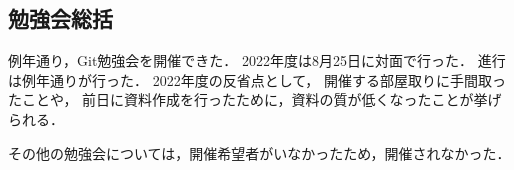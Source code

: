 \subsection*{勉強会総括}

例年通り，Git勉強会を開催できた．
2022年度は8月25日に対面で行った．
進行は例年通り\secondGrade{}が行った．
2022年度の反省点として，
開催する部屋取りに手間取ったことや，
前日に資料作成を行ったために，資料の質が低くなったことが挙げられる．

その他の勉強会については，開催希望者がいなかったため，開催されなかった．
